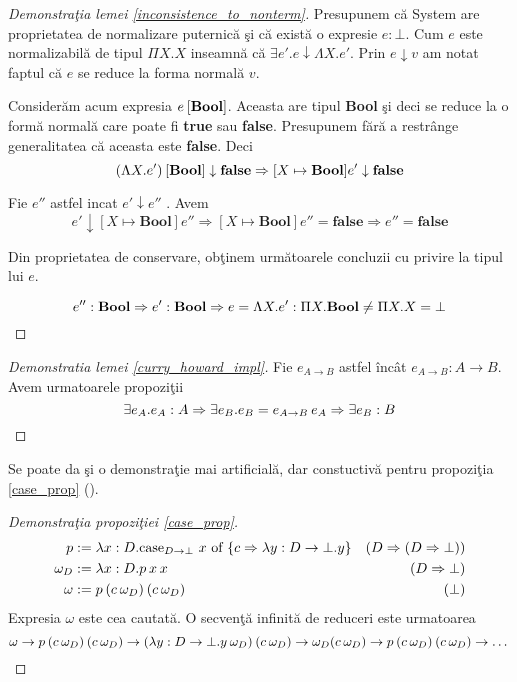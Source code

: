 \begin{proof}[Demonstra\c tia lemei \ref{inconsistence_to_nonterm}]
Presupunem c\u a System \frec are proprietatea de normalizare puternic\u a \c si c\u a exist\u a o expresie $e : \bot $. Cum $e$ este normalizabil\u a de tipul $\Pi X. X$ inseamn\u a c\u a $\exists e'. e \downarrow \Lambda X.e'$. Prin $e \downarrow v$ am notat faptul c\u a $e$ se reduce la forma normal\u a $v$.

Consider\u am acum expresia $e \hspace{2pt} [ \textbf{{Bool}} ]$. Aceasta are tipul \textbf{{Bool}} \c si deci se reduce la o form\u a normal\u a care poate fi \textbf{{true}} sau \textbf{{false}}. Presupunem f\u ar\u a a restr\^ ange generalitatea c\u a aceasta este \textbf{{false}}. Deci
\begin{equation*}
(\Lambda X.e')\hspace{2pt} [\textbf{{Bool}}] \downarrow \textbf{{false}} \Rightarrow [X \mapsto\textbf{{Bool}}] e' \downarrow \textbf{{false}}
\end{equation*}

Fie $e''$ astfel incat $e'\downarrow e''$ . Avem
\begin{equation*}
[X \mapsto\textbf{{Bool}}] e' \downarrow [X \mapsto\textbf{{Bool}}] e'' \Rightarrow
[X \mapsto\textbf{{Bool}}] e'' = \textbf{{false}}  \Rightarrow
e'' = \textbf{false}
\end{equation*}

Din proprietatea de conservare, ob\c tinem urm\u atoarele concluzii cu privire la tipul lui $e$.

\begin{equation*}
    e'' : \textbf{{Bool}} \Rightarrow
    e'  : \textbf{{Bool}} \Rightarrow
    e = \Lambda X.e' : \Pi X. \textbf{{Bool}} \neq \Pi X.X = \bot \qedhere
\end{equation*}
\end{proof}

\begin{proof}[Demonstratia lemei \ref{curry_howard_impl}]
Fie $e_{A \to B}$ astfel \^ inc\^ at $e_{A \to B} : A \to B$. Avem urmatoarele propozi\c tii
\[\exists e_A. e_A : A \Rightarrow \exists e_B . e_B = e_{A \to B}\hspace{2pt} e_A \Rightarrow \exists e_B : B \qedhere\]
\end{proof}
Se poate da \c si o demonstra\c tie mai artificial\u a, dar constuctiv\u a pentru propozi\c tia \ref{case_prop} (\citep{1614481}).
\begin{proof}[Demonstra\c tia propozi\c tiei \ref{case_prop}]
\begin{align*}
p &:= \lambda x : D. \text{{case}}_{D\to \bot}\ x \text{ {of} } \{ c \Rightarrow \lambda y : D \to \bot . y \} &{ (D \Rightarrow (D \Rightarrow \bot))} \\
\omega_D &:= \lambda x : D. p\hspace{2pt} x\hspace{2pt} x &{ (D \Rightarrow \bot)}\\
\omega &:= p\hspace{2pt}  (c\hspace{2pt} \omega_D) \hspace{2pt} (c\hspace{2pt} \omega_D) &{ (\bot)}
\end{align*}
Expresia $\omega$ este cea cautat\u a. O secven\c t\u a infinit\u a de reduceri este urmatoarea
\[ \omega \to p\hspace{2pt} (c\hspace{2pt} \omega_D)\hspace{2pt} (c\hspace{2pt} \omega_D) \to (\lambda y : D \to \bot . y\hspace{2pt}  \omega_D)\hspace{2pt} (c\hspace{2pt} \omega_D) \to \omega_D (c\hspace{2pt} \omega_D) \to p\hspace{2pt} (c\hspace{2pt} \omega_D)\hspace{2pt} (c\hspace{2pt} \omega_D)\to \dots \qedhere \]
\end{proof}

